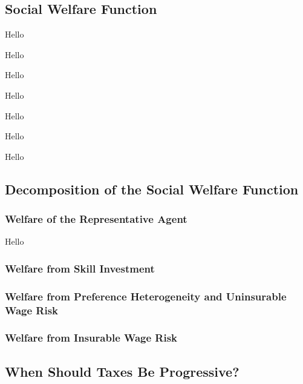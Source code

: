 \documentclass{article}
\begin{document}
\subsection{Social Welfare Function}



{
\proposition Hello

}

{
\corollary Hello

}

{
\corollary Hello

}

{
\corollary Hello

}

{
\corollary Hello

}

{
\corollary Hello

}

{
\corollary Hello

}

\subsection{Decomposition of the Social Welfare Function}

\subsubsection{Welfare of the Representative Agent}

{
\proposition Hello

}

\subsubsection{Welfare from Skill Investment}

\subsubsection{Welfare from Preference Heterogeneity and Uninsurable Wage Risk}

\subsubsection{Welfare from Insurable Wage Risk}


\subsection{When Should Taxes Be Progressive?}
\end{document}
